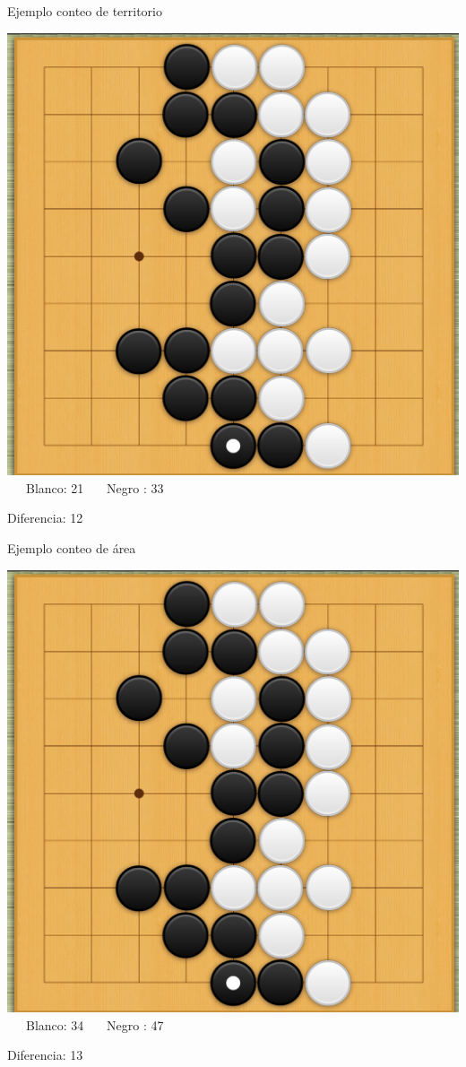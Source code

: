 \documentclass{beamer}
\begin{document}
\begin{frame}{Ejemplo conteo de territorio}
  
    \includegraphics[scale=0.17]{ejemplo-conteo-negroult.png} \ \ \ Blanco: 21 \ \ \ Negro : 33  
  
  Diferencia: 12
  
\end{frame}

\begin{frame}{Ejemplo conteo de área}
  
    \includegraphics[scale=0.17]{ejemplo-conteo-negroult.png} \ \ \ Blanco: 34 \ \ \ Negro : 47  
  
  Diferencia: 13
  
\end{frame}
\end{document}
